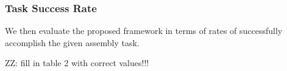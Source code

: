 \documentclass[letterpaper, 10 pt, conference]{ieeeconf}  %
\newcommand{\zz}[1]{{\color{red}ZZ: #1}}
\begin{document}
\subsubsection{Task Success Rate}
We then evaluate the proposed framework in terms of rates of successfully accomplish the given assembly task.

\zz{fill in table 2 with correct values!!!}





\end{document}
